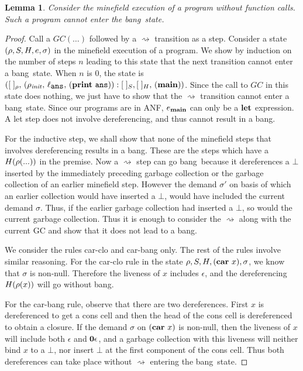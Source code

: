\documentclass[9pt]{sigplanconf}
\newcommand{\bang}{\mbox{\sc bang}}
\newtheorem{lemma}[theorem]{Lemma}
\begin{document}
\begin{lemma}
\label{lemma:call-less-cannot-go-bang}
Consider the minefield execution of  a program without function calls.
Such a program cannot enter the \bang\ state.
\end{lemma}
\begin{proof}
Call a $GC(\ldots)$  followed by a $\rightsquigarrow$  transition as a
step. Consider a state $(\rho, S,  H, e, \sigma)$ in the minefield
execution of a  program.  We show by induction on  the number of steps
$n$ leading  to this  state that  the next  transition cannot  enter a
\bang\ state.  When $n$ is 0,  the state is $([\;]_\rho,\,    (\rho_\mathit{init},   \, \ell_{\mathbf{\mbox{\tt ans}}}  ,\,
(\mathbf{print}~\mathbf{\mbox{\tt ans}})):[\;]_{S}, 
[\;]_{H},\, (\mathbf{main}))$.   Since  the
            call to $GC$  in this state does  nothing, we just
            have to show that the $\rightsquigarrow$ transition cannot
            enter  a \bang\  state.  Since  our programs  are in  ANF,
            $e_{\mathbf{main}}$ can  only be  a $\mbox{$\mathbf{ let}$}$ expression.   A {\sc
              let}  step  does  not involve  dereferencing,  and  thus
            cannot result in a \bang.

For the inductive step, we shall show that none of the minefield steps
that involves dereferencing  results in a \bang.  These  are the steps
which   have   a   $H(\rho(...))$   in   the   premise.    Now   a
$\rightsquigarrow$ step can go \bang\ because it dereferences a $\bot$
inserted  by  the  immediately  preceding garbage  collection  or  the
garbage collection of an earlier minefield step.  However the
  demand $\sigma'$ on basis of  which an earlier collection would have
  inserted a $\bot$, would have  included the current demand $\sigma$.
  Thus, if  the earlier garbage  collection had inserted a  $\bot$, so
  would the current garbage collection.  Thus it is enough to consider
  the $\rightsquigarrow$  along with the  current GC and show  that it
  does not lead to a \bang.

We consider the rules {\sc car-clo} and {\sc car-bang} only.  
The rest  of the rules involve similar reasoning. For the {\sc
  car-clo}  rule in  the state  $\rho, S,  H, (\mbox{$\mathbf{car}$}~x),
\sigma$, we  know that $\sigma$ is  non-null. Therefore
the  liveness  of  $x$  includes  $\epsilon$,  and  the
dereferencing $H(\rho(x))$ will go without \bang.

For the  {\sc car-bang}  rule, observe that  there are
two dereferences.  First $x$  is dereferenced to  get a
cons  cell  and then  the  head  of  the cons  cell  is
dereferenced  to  obtain  a  closure.   If  the  demand
$\sigma$ on  $(\mbox{$\mathbf{car}$}~x)$ is non-null, then  the liveness
of    $x$   will    include    both   $\epsilon$    and
$\mathbf{0}\epsilon$,  and  a  garbage collection with  this  liveness  will
neither bind $x$ to a  $\bot$, nor insert $\bot$ at the
first   component  of   the   cons   cell.  Thus   both
dereferences    can take place without 
$\rightsquigarrow$ entering the   \bang\ state.
\end{proof} 
\end{document}
